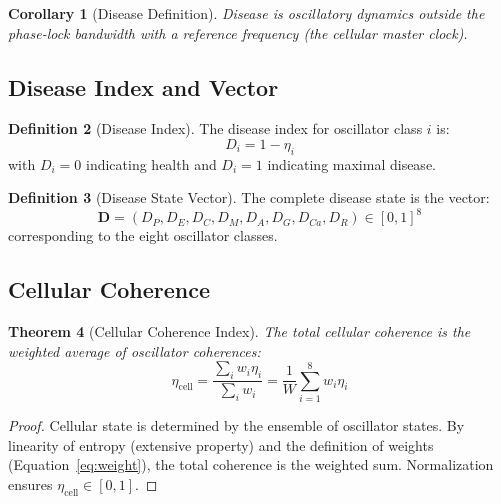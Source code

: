 \documentclass[10pt,twocolumn]{article}
\theoremstyle{plain}
\newtheorem{theorem}{Theorem}[section]
\newtheorem{corollary}[theorem]{Corollary}
\theoremstyle{definition}
\newtheorem{definition}[theorem]{Definition}
\theoremstyle{remark}
\newcommand{\etacell}{\eta_{\mathrm{cell}}}
\newcommand{\Dvec}{\mathbf{D}}
\begin{document}
\begin{corollary}[Disease Definition]
\label{cor:disease_def}
Disease is oscillatory dynamics outside the phase-lock bandwidth with a reference frequency (the cellular master clock).
\end{corollary}

\subsection{Disease Index and Vector}

\begin{definition}[Disease Index]
\label{def:disease_index}
The disease index for oscillator class $i$ is:
\begin{equation}
D_i = 1 - \eta_i
\label{eq:disease_index}
\end{equation}
with $D_i = 0$ indicating health and $D_i = 1$ indicating maximal disease.
\end{definition}

\begin{definition}[Disease State Vector]
\label{def:disease_vector}
The complete disease state is the vector:
\begin{equation}
\Dvec = (D_P, D_E, D_C, D_M, D_A, D_G, D_{Ca}, D_R) \in [0,1]^8
\label{eq:disease_vector}
\end{equation}
corresponding to the eight oscillator classes.
\end{definition}

\subsection{Cellular Coherence}

\begin{theorem}[Cellular Coherence Index]
\label{thm:cellular_coherence}
The total cellular coherence is the weighted average of oscillator coherences:
\begin{equation}
\etacell = \frac{\sum_i w_i \eta_i}{\sum_i w_i} = \frac{1}{W}\sum_{i=1}^{8} w_i \eta_i
\label{eq:cellular_coherence}
\end{equation}
\end{theorem}

\begin{proof}
Cellular state is determined by the ensemble of oscillator states. By linearity of entropy (extensive property) and the definition of weights (Equation~\ref{eq:weight}), the total coherence is the weighted sum. Normalization ensures $\etacell \in [0,1]$.
\end{proof}
\end{document}
